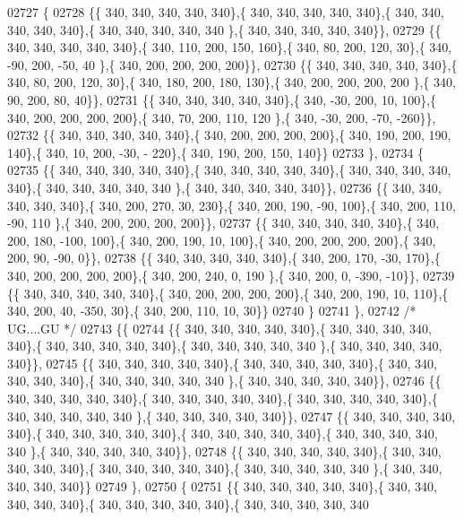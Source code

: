 \begin{DoxyCode}
02727 \{
02728 \{\{ 340, 340, 340, 340, 340\},\{ 340, 340, 340, 340, 340\},\{ 340, 340, 340, 340, 340\},\{ 340, 340, 340, 340, 340
      \},\{ 340, 340, 340, 340, 340\}\},
02729 \{\{ 340, 340, 340, 340, 340\},\{ 340, 110, 200, 150, 160\},\{ 340,  80, 200, 120,  30\},\{ 340, -90, 200, -50,  40
      \},\{ 340, 200, 200, 200, 200\}\},
02730 \{\{ 340, 340, 340, 340, 340\},\{ 340,  80, 200, 120,  30\},\{ 340, 180, 200, 180, 130\},\{ 340, 200, 200, 200, 200
      \},\{ 340,  90, 200,  80,  40\}\},
02731 \{\{ 340, 340, 340, 340, 340\},\{ 340, -30, 200,  10, 100\},\{ 340, 200, 200, 200, 200\},\{ 340,  70, 200, 110, 120
      \},\{ 340, -30, 200, -70, -260\}\},
02732 \{\{ 340, 340, 340, 340, 340\},\{ 340, 200, 200, 200, 200\},\{ 340, 190, 200, 190, 140\},\{ 340,  10, 200, -30, -
      220\},\{ 340, 190, 200, 150, 140\}\}
02733 \},
02734 \{
02735 \{\{ 340, 340, 340, 340, 340\},\{ 340, 340, 340, 340, 340\},\{ 340, 340, 340, 340, 340\},\{ 340, 340, 340, 340, 340
      \},\{ 340, 340, 340, 340, 340\}\},
02736 \{\{ 340, 340, 340, 340, 340\},\{ 340, 200, 270,  30, 230\},\{ 340, 200, 190, -90, 100\},\{ 340, 200, 110, -90, 110
      \},\{ 340, 200, 200, 200, 200\}\},
02737 \{\{ 340, 340, 340, 340, 340\},\{ 340, 200, 180, -100, 100\},\{ 340, 200, 190,  10, 100\},\{ 340, 200, 200, 200, 
      200\},\{ 340, 200,  90, -90,   0\}\},
02738 \{\{ 340, 340, 340, 340, 340\},\{ 340, 200, 170, -30, 170\},\{ 340, 200, 200, 200, 200\},\{ 340, 200, 240,   0, 190
      \},\{ 340, 200,   0, -390, -10\}\},
02739 \{\{ 340, 340, 340, 340, 340\},\{ 340, 200, 200, 200, 200\},\{ 340, 200, 190,  10, 110\},\{ 340, 200,  40, -350,  
      30\},\{ 340, 200, 110,  10,  30\}\}
02740 \}
02741 \},
02742 \textcolor{comment}{/* UG....GU */}
02743 \{\{
02744 \{\{ 340, 340, 340, 340, 340\},\{ 340, 340, 340, 340, 340\},\{ 340, 340, 340, 340, 340\},\{ 340, 340, 340, 340, 340
      \},\{ 340, 340, 340, 340, 340\}\},
02745 \{\{ 340, 340, 340, 340, 340\},\{ 340, 340, 340, 340, 340\},\{ 340, 340, 340, 340, 340\},\{ 340, 340, 340, 340, 340
      \},\{ 340, 340, 340, 340, 340\}\},
02746 \{\{ 340, 340, 340, 340, 340\},\{ 340, 340, 340, 340, 340\},\{ 340, 340, 340, 340, 340\},\{ 340, 340, 340, 340, 340
      \},\{ 340, 340, 340, 340, 340\}\},
02747 \{\{ 340, 340, 340, 340, 340\},\{ 340, 340, 340, 340, 340\},\{ 340, 340, 340, 340, 340\},\{ 340, 340, 340, 340, 340
      \},\{ 340, 340, 340, 340, 340\}\},
02748 \{\{ 340, 340, 340, 340, 340\},\{ 340, 340, 340, 340, 340\},\{ 340, 340, 340, 340, 340\},\{ 340, 340, 340, 340, 340
      \},\{ 340, 340, 340, 340, 340\}\}
02749 \},
02750 \{
02751 \{\{ 340, 340, 340, 340, 340\},\{ 340, 340, 340, 340, 340\},\{ 340, 340, 340, 340, 340\},\{ 340, 340, 340, 340, 340

\end{DoxyCode}
